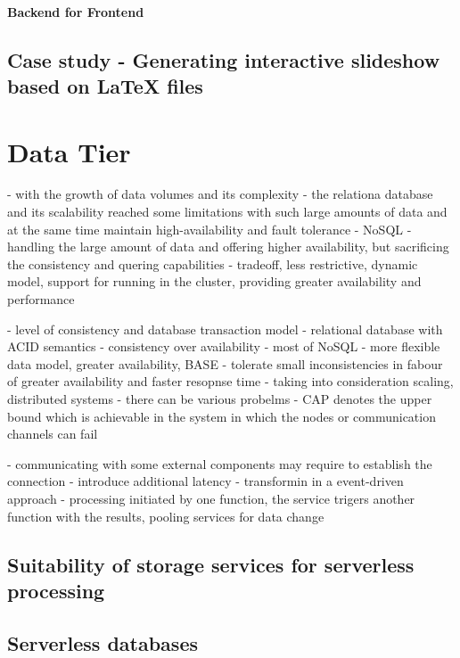 \paragraph{Backend for Frontend}

\subsection{Case study - Generating interactive slideshow based on LaTeX files} \label{chapter:latex-processing-optimisation}

\section{Data Tier}

\label{chapter:database-paradigms}
- with the growth of data volumes and its complexity - the relationa database and its scalability reached some limitations with such large amounts of data and at the same time maintain high-availability and fault tolerance
- NoSQL - handling the large amount of data and offering higher availability, but sacrificing the consistency and quering capabilities - tradeoff, less restrictive, dynamic model, support for running in the cluster, providing greater availability and performance

\label{chapter:database-management-tradeoffs}
- level of consistency and database transaction model
- relational database with ACID semantics - consistency over availability
- most of NoSQL - more flexible data model, greater availability, BASE - tolerate small inconsistencies in fabour of greater availability and faster resopnse time
- taking into consideration scaling, distributed systems - there can be various probelms - CAP denotes the upper bound which is achievable in the system in which the nodes or communication channels can fail

\label{chapter:serverless-suitability-operation-types}
- communicating with some external components may require to establish the connection - introduce additional latency
- transformin in a event-driven approach - processing initiated by one function, the service trigers another function with the results, pooling services for data change

\subsection{Suitability of storage services for serverless processing}

\subsection{Serverless databases}

